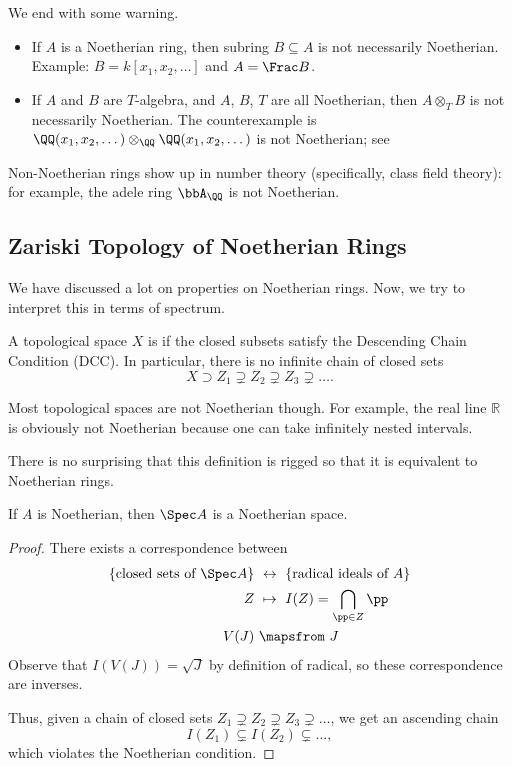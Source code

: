 We end with some warning.
\begin{warn}    
    \begin{itemize}
    \item If $A$ is a Noetherian ring,
    then subring $B\subseteq A$ is not necessarily Noetherian.
    Example: $B=k[x_1,x_2,\dots]$ and $A=\Frac B$.
    \item If $A$ and $B$ are $T$-algebra, 
    and $A$, $B$, $T$ are all Noetherian,
    then $A\otimes_T B$ is not necessarily Noetherian.
    The counterexample is $\QQ(x_1,x_2,\dots) \otimes_\QQ 
    \QQ(x_1,x_2,\dots)$ is not Noetherian;
    see \cite[Theorem 11]{Vamos}
    \end{itemize}
    Non-Noetherian rings show up in number theory
    (specifically, class field theory):
    for example, the adele ring $\bbA_\QQ$ is not Noetherian.
\end{warn}
%
%
%
%
\subsection{Zariski Topology of Noetherian Rings}
\label{subsec:irreducible_comp}
We have discussed a lot on properties on Noetherian rings.
Now, we try to interpret this in terms of spectrum.
\begin{definition}
    A topological space $X$ is 
    if the closed subsets satisfy the Descending Chain
    Condition (DCC).
    In particular, there is no infinite chain
    of closed sets
    $$X\supset Z_1\supsetneq Z_2\supsetneq Z_3\supsetneq\dots.$$
\end{definition}
Most topological spaces are not Noetherian though.
For example, the real line $\mathbb R$ is obviously
not Noetherian because one can take infinitely nested intervals.

There is no surprising that this definition
is rigged so that it is equivalent to Noetherian rings.
\begin{proposition}
    If $A$ is Noetherian, then $\Spec A$ is a Noetherian space.
\end{proposition}
\begin{proof}
    There exists a correspondence between
    \begin{align*}
        \{\text{closed sets of }\Spec A\}
        &\ \leftrightarrow\ \{\text{radical ideals of }A\} \\
        Z &\ \mapsto\ I(Z) = \bigcap_{\pp\in Z} \pp \\
        V(J) &\ \mapsfrom\ J
    \end{align*}
    Observe that $I(V(J)) = \sqrt{J}$ by definition of radical,
    so these correspondence are inverses.
    
    Thus, given a chain of closed sets
    $Z_1\supsetneq Z_2\supsetneq Z_3\supsetneq\dots$,
    we get an ascending chain
    $$I(Z_1)\subsetneq I(Z_2)\subsetneq \dots,$$
    which violates the Noetherian condition.
\end{proof}
